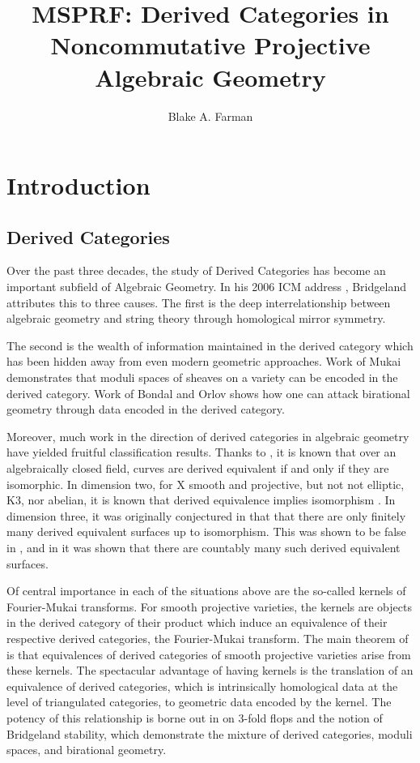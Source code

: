 \documentclass[11pt]{article}
\title{MSPRF: Derived Categories in Noncommutative Projective Algebraic Geometry}
\author{Blake A. Farman}
\date{}
\begin{document}
\maketitle

\section{Introduction}
\subsection{Derived Categories}
Over the past three decades, the study of Derived Categories has become an important subfield of Algebraic Geometry.
In his 2006 ICM address \cite{Bridgeland06}, Bridgeland attributes this to three causes.
The first is the deep interrelationship between algebraic geometry and string theory through homological mirror symmetry.

The second is the wealth of information maintained in the derived category which has been hidden away from even modern geometric approaches.
Work of Mukai \cite{Mukai81,Mukai87} demonstrates that moduli spaces of sheaves on a variety can be encoded in the derived category.
Work of Bondal and Orlov \cite{Bondal-Orlov} shows how one can attack birational geometry through data encoded in the derived category.

Moreover, much work in the direction of derived categories in algebraic geometry have yielded fruitful classification results.
Thanks to \cite{Orlov1997}, it is known that over an algebraically closed field, curves are derived equivalent if and only if they are isomorphic.
In dimension two, for X smooth and projective, but not not elliptic, K3, nor abelian, it is known that derived equivalence implies isomorphism \cite[Prop. 12.1]{HuyFMT}.
In dimension three, it was originally conjectured in \cite{kawamata2002} that that there are only finitely many derived equivalent surfaces up to isomorphism.
This was shown to be false in \cite{lesieutre2014}, and in \cite{AnToe} it was shown that there are countably many such derived equivalent surfaces.

Of central importance in each of the situations above are the so-called kernels of Fourier-Mukai transforms.
For smooth projective varieties, the kernels are objects in the derived category of their product which induce an equivalence of their respective derived categories, the Fourier-Mukai transform.
The main theorem of \cite{Orlov1997} is that equivalences of derived categories of smooth projective varieties arise from these kernels.
The spectacular advantage of having kernels is the translation of an equivalence of derived categories, which is intrinsically homological data at the level of triangulated categories, to geometric data encoded by the kernel.
The potency of this relationship is borne out in \cite{Bridgeland02} on 3-fold flops and the notion of Bridgeland stability, which demonstrate the mixture of derived categories, moduli spaces, and birational geometry.
\end{document}
